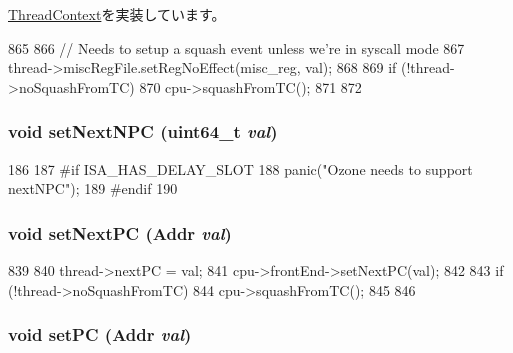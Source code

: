 \hyperlink{classThreadContext_a2987c1ff22ebdf6cdf354a31462bdbfb}{ThreadContext}を実装しています。


\begin{DoxyCode}
865 {
866     // Needs to setup a squash event unless we're in syscall mode
867     thread->miscRegFile.setRegNoEffect(misc_reg, val);
868 
869     if (!thread->noSquashFromTC) {
870         cpu->squashFromTC();
871     }
872 }
\end{DoxyCode}
\hypertarget{classOzoneCPU_1_1OzoneTC_ad9318b66094af0afc4246ccce9fafe0b}{
\subsubsection[{setNextNPC}]{\setlength{\rightskip}{0pt plus 5cm}void setNextNPC (uint64\_\-t {\em val})}}
\label{classOzoneCPU_1_1OzoneTC_ad9318b66094af0afc4246ccce9fafe0b}



\begin{DoxyCode}
186         {
187 #if ISA_HAS_DELAY_SLOT
188             panic("Ozone needs to support nextNPC");
189 #endif
190         }
\end{DoxyCode}
\hypertarget{classOzoneCPU_1_1OzoneTC_a81b908e5de6420bc0c5a0c5b9b1e38c2}{
\subsubsection[{setNextPC}]{\setlength{\rightskip}{0pt plus 5cm}void setNextPC ({\bf Addr} {\em val})}}
\label{classOzoneCPU_1_1OzoneTC_a81b908e5de6420bc0c5a0c5b9b1e38c2}



\begin{DoxyCode}
839 {
840     thread->nextPC = val;
841     cpu->frontEnd->setNextPC(val);
842 
843     if (!thread->noSquashFromTC) {
844         cpu->squashFromTC();
845     }
846 }
\end{DoxyCode}
\hypertarget{classOzoneCPU_1_1OzoneTC_a9bd96a8460a26f24f520db702f3f6eec}{
\subsubsection[{setPC}]{\setlength{\rightskip}{0pt plus 5cm}void setPC ({\bf Addr} {\em val})}}
\label{classOzoneCPU_1_1OzoneTC_a9bd96a8460a26f24f520db702f3f6eec}



